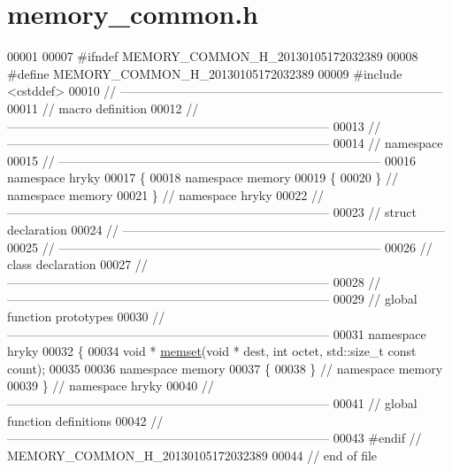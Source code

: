 \hypertarget{memory__common_8h_source}{\section{memory\-\_\-common.\-h}
}

\begin{DoxyCode}
00001 
00007 \textcolor{preprocessor}{#ifndef MEMORY\_COMMON\_H\_20130105172032389}
00008 \textcolor{preprocessor}{}\textcolor{preprocessor}{#define MEMORY\_COMMON\_H\_20130105172032389}
00009 \textcolor{preprocessor}{}\textcolor{preprocessor}{#include <cstddef>}
00010 \textcolor{comment}{//
      ------------------------------------------------------------------------------}
00011 \textcolor{comment}{// macro definition}
00012 \textcolor{comment}{//
      ------------------------------------------------------------------------------}
00013 \textcolor{comment}{//
      ------------------------------------------------------------------------------}
00014 \textcolor{comment}{// namespace}
00015 \textcolor{comment}{//
      ------------------------------------------------------------------------------}
00016 \textcolor{keyword}{namespace }hryky
00017 \{
00018 \textcolor{keyword}{namespace }memory
00019 \{
00020 \} \textcolor{comment}{// namespace memory}
00021 \} \textcolor{comment}{// namespace hryky}
00022 \textcolor{comment}{//
      ------------------------------------------------------------------------------}
00023 \textcolor{comment}{// struct declaration}
00024 \textcolor{comment}{//
      ------------------------------------------------------------------------------}
00025 \textcolor{comment}{//
      ------------------------------------------------------------------------------}
00026 \textcolor{comment}{// class declaration}
00027 \textcolor{comment}{//
      ------------------------------------------------------------------------------}
00028 \textcolor{comment}{//
      ------------------------------------------------------------------------------}
00029 \textcolor{comment}{// global function prototypes}
00030 \textcolor{comment}{//
      ------------------------------------------------------------------------------}
00031 \textcolor{keyword}{namespace }hryky
00032 \{
00034     \textcolor{keywordtype}{void} * \hyperlink{namespacehryky_a50f9095eab4dc96e5fa813f8fc8fba7e}{memset}(\textcolor{keywordtype}{void} * dest, \textcolor{keywordtype}{int} octet, std::size\_t \textcolor{keyword}{const} count);
00035 
00036 \textcolor{keyword}{namespace }memory
00037 \{
00038 \} \textcolor{comment}{// namespace memory}
00039 \} \textcolor{comment}{// namespace hryky}
00040 \textcolor{comment}{//
      ------------------------------------------------------------------------------}
00041 \textcolor{comment}{// global function definitions}
00042 \textcolor{comment}{//
      ------------------------------------------------------------------------------}
00043 \textcolor{preprocessor}{#endif // MEMORY\_COMMON\_H\_20130105172032389}
00044 \textcolor{preprocessor}{}\textcolor{comment}{// end of file}
\end{DoxyCode}
